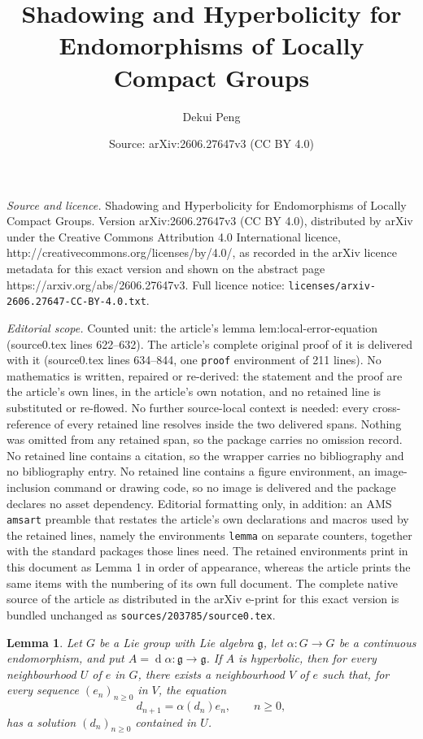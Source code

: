 \documentclass[10pt,a4paper]{amsart}
\title{Shadowing and Hyperbolicity for Endomorphisms of Locally Compact Groups}
\author{Dekui Peng}
\date{Source: arXiv:2606.27647v3 (CC BY 4.0)}
\newtheorem{lemma}{Lemma}
\DeclareMathOperator{\di}{d}
\begin{document}
\maketitle

\noindent\emph{Source and licence.} Shadowing and Hyperbolicity for Endomorphisms of Locally Compact Groups. Version arXiv:2606.27647v3 (CC BY 4.0), distributed by arXiv under the Creative Commons Attribution 4.0 International licence, http://creativecommons.org/licenses/by/4.0/, as recorded in the arXiv licence metadata for this exact version and shown on the abstract page https://arxiv.org/abs/2606.27647v3. Full licence notice: \texttt{licenses/arxiv-2606.27647-CC-BY-4.0.txt}.\par\smallskip

\noindent\textit{Editorial scope.} Counted unit: the article's lemma lem:local-error-equation (source0.tex lines 622--632). The article's complete original proof of it is delivered with it (source0.tex lines 634--844, one \texttt{proof} environment of 211 lines). No mathematics is written, repaired or re-derived: the statement and the proof are the article's own lines, in the article's own notation, and no retained line is substituted or re-flowed.  No further source-local context is needed: every cross-reference of every retained line resolves inside the two delivered spans.  Nothing was omitted from any retained span, so the package carries no omission record.  No retained line contains a citation, so the wrapper carries no bibliography and no bibliography entry.  No retained line contains a figure environment, an image-inclusion command or drawing code, so no image is delivered and the package declares no asset dependency.  Editorial formatting only, in addition: an AMS \texttt{amsart} preamble that restates the article's own declarations and macros used by the retained lines, namely the environments \texttt{lemma} on separate counters, together with the standard packages those lines need.  The retained environments print in this document as Lemma 1 in order of appearance, whereas the article prints the same items with the numbering of its own full document.  The complete native source of the article as distributed in the arXiv e-print for this exact version is bundled unchanged as \texttt{sources/203785/source0.tex}.
\begin{lemma}\label{lem:local-error-equation}
Let $G$ be a Lie group with Lie algebra $\mathfrak g$, let $\alpha:G\to G$ be a continuous endomorphism,
and put $A=\di\alpha:\mathfrak g\to\mathfrak g$. If $A$ is hyperbolic, then
for every neighbourhood $U$ of $e$ in $G$, there exists a neighbourhood
$V$ of $e$ such that, for every sequence $(e_n)_{n\geq 0}$ in $V$, the
equation
\begin{equation}\label{eq:error-equation}
d_{n+1}=\alpha(d_n)e_n,\qquad n\geq 0,
\end{equation}
has a solution $(d_n)_{n\geq 0}$ contained in $U$.
\end{lemma}
\end{document}
